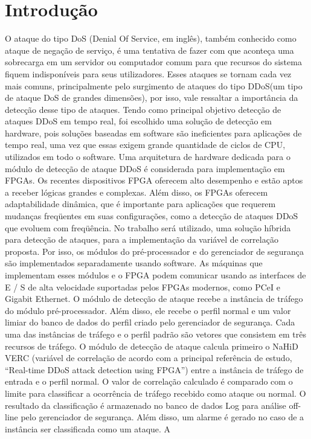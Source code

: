 \chapter{Introdução}\label{CAP:introducao}

O ataque do tipo DoS (Denial Of Service, em inglês), também conhecido como ataque de negação de serviço, é uma tentativa de fazer com que aconteça uma sobrecarga em um servidor ou computador comum para que recursos do sistema fiquem indisponíveis para seus utilizadores. Esses ataques se tornam cada vez mais comuns, principalmente pelo surgimento de ataques do tipo DDoS(um tipo de ataque DoS de grandes dimensões), por isso, vale ressaltar a importância da detecção desse tipo de ataques. Tendo como principal objetivo detecção de ataques DDoS em tempo real, foi escolhido uma solução de detecção em hardware, pois soluções baseadas em software são ineficientes para aplicações de tempo real, uma vez que essas exigem grande quantidade de ciclos de CPU, utilizados em todo o software. Uma arquitetura de hardware dedicada para o módulo de detecção de ataque DDoS é considerada para implementação em FPGAs. Os recentes dispositivos FPGA oferecem alto desempenho e estão aptos a receber lógicas grandes e complexas. Além disso, os FPGAs oferecem adaptabilidade dinâmica, que é importante para aplicações que requerem mudanças freqüentes em suas configurações, como a detecção de ataques DDoS que evoluem com freqüência. No trabalho será utilizado, uma solução híbrida para detecção de ataques, para a implementação da variável de correlação proposta. Por isso, os módulos do pré-processador e do gerenciador de segurança são implementados separadamente usando software. As máquinas que implementam esses módulos e o FPGA podem comunicar usando as interfaces de E / S de alta velocidade suportadas pelos FPGAs modernos, como PCeI e Gigabit Ethernet. O módulo de detecção de ataque recebe a instância de tráfego do módulo pré-processador. Além disso, ele recebe o perfil normal e um valor limiar do banco de dados do perfil criado pelo gerenciador de segurança. Cada uma das instâncias de tráfego e o perfil padrão são vetores que consistem em três recursos de tráfego. O módulo de detecção de ataque calcula primeiro o NaHiD VERC (variável de correlação de acordo com a principal referência de estudo, “Real-time DDoS attack detection using FPGA”) entre a instância de tráfego de entrada e o perfil normal. O valor de correlação calculado é comparado com o limite para classificar a ocorrência de tráfego recebido como ataque ou normal. O resultado da classificação é armazenado no banco de dados Log para análise off-line pelo gerenciador de segurança. Além disso, um alarme é gerado no caso de a instância ser classificada como um ataque. A
